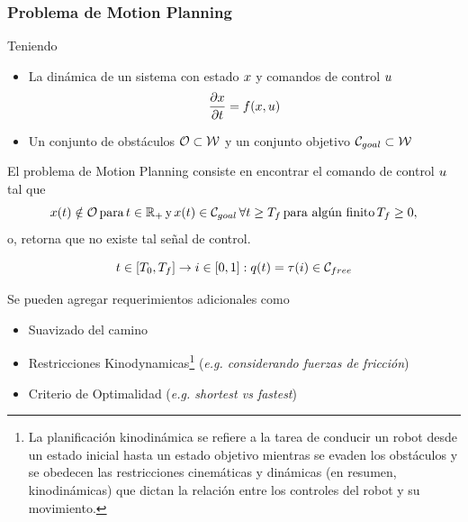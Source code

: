 \begin{frame}
    \frametitle{Problema de Motion Planning}
    
    \footnotesize
    
    Teniendo 
    \begin{itemize}
        \item La dinámica de un sistema con estado $x$ y comandos de control $u$
        \begin{equation*}
            \dfrac{\partial x}{\partial t} = f(x,u)
        \end{equation*}
        \item Un conjunto de obstáculos $\mathcal{O} \subset \mathcal{W}$ y un conjunto objetivo $\mathcal{C}_{goal} \subset \mathcal{W}$     
    \end{itemize}
    El problema de Motion Planning consiste en encontrar el comando de control $u$ tal que 
    \begin{equation*}
        x(t) \notin \mathcal{O} \, \text{para} \,  t \in \mathbb{R}_{+} \, \text{y} \, x(t) \in \mathcal{C}_{goal} \,  \forall t \ge T_{f} \, \text{para algún finito} \, T_{f} \geq 0,
    \end{equation*}    
    o, retorna que no existe tal señal de control.
    
    \begin{equation*}
        t \in [T_{0} , T_{f}] \rightarrow i \in [0, 1] : q(t) = \tau(i) \in \mathcal{C}_{free}
    \end{equation*}
    
    Se pueden agregar requerimientos adicionales como
    \begin{itemize}
        \item Suavizado del camino
        \item Restricciones Kinodynamicas\footnote{La planificación kinodinámica se refiere a la tarea de conducir un robot desde un estado inicial hasta un estado objetivo mientras se evaden los obstáculos y se obedecen las restricciones cinemáticas y dinámicas (en resumen, kinodinámicas) que dictan la relación entre los controles del robot y su movimiento.} (\emph{e.g. considerando fuerzas de fricción})
        \item Criterio de Optimalidad (\emph{e.g. shortest vs fastest})
    \end{itemize}
\end{frame}



